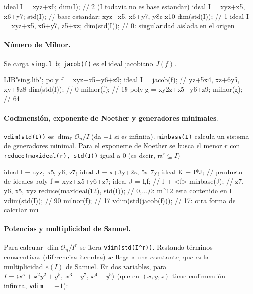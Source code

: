 \documentclass[11pt,a4paper]{article}
\begin{document}
\begin{singular}
ideal I = xyz+x5;
dim(I);                     // 2 (I todavia no es base estandar)
ideal I = xyz+x5, x6+y7;
std(I);                     // base estandar: xyz+x5, x6+y7, y8z-x10
dim(std(I));                // 1
ideal I = xyz+x5, x6+y7, z5+xz;
dim(std(I));                // 0: singularidad aislada en el origen
\end{singular}

\paragraph{Número de Milnor.} Se carga \texttt{sing.lib}; \texttt{jacob(f)} es el ideal jacobiano $J(f)$.

\begin{singular}
LIB"sing.lib";
poly f = xyz+x5+y6+z9;
ideal I = jacob(f);         // yz+5x4, xz+6y5, xy+9z8
dim(std(I));                // 0
milnor(f);                  // 19
poly g = xy2z+x5+y6+z9;
milnor(g);                  // 64
\end{singular}

\paragraph{Codimensión, exponente de Noether y generadores minimales.} \texttt{vdim(std(I))} es $\dim_{\mathbb{C}} \mathcal{O}_n/I$ (da $-1$ si es infinita). \texttt{minbase(I)} calcula un sistema de generadores minimal. Para el exponente de Noether se busca el menor $r$ con \texttt{reduce(maxideal(r), std(I))} igual a $0$ (es decir, $\mathfrak{m}^r \subseteq I$).

\begin{singular}
ideal I = xyz, x5, y6, z7;
ideal J = x+3y+2z, 5x-7y;
ideal K = I*J;              // producto de ideales
poly f = xyz+x5+y6+z7;
ideal J = I,f;              // I + <f>
minbase(J);                 // z7, y6, x5, xyz
reduce(maxideal(12), std(I));   // 0,...,0: m^12 esta contenido en I
vdim(std(I));               // 90
milnor(f);                  // 17
vdim(std(jacob(f)));        // 17: otra forma de calcular mu
\end{singular}

\paragraph{Potencias y multiplicidad de Samuel.} Para calcular $\dim \mathcal{O}_n/I^r$ se itera \texttt{vdim(std(I\^{}r))}. Restando términos consecutivos (diferencias iteradas) se llega a una constante, que es la multiplicidad $e(I)$ de Samuel. En dos variables, para $I = \langle x^5+x^2y^2+y^5,\ x^3-y^7,\ x^4-y^5\rangle$ (que en $(x,y,z)$ tiene codimensión infinita, \texttt{vdim} $=-1$):
\end{document}
